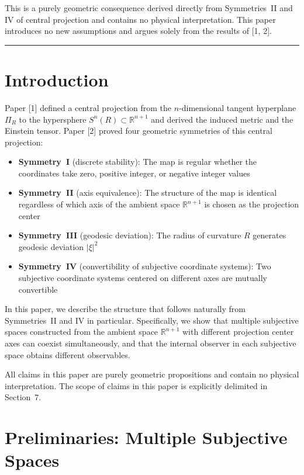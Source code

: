 \documentclass[a4paper,11pt]{article}
\theoremstyle{definition}
\begin{document}
This is a purely geometric consequence derived directly from Symmetries~II and IV of central projection and contains no physical interpretation. This paper introduces no new assumptions and argues solely from the results of {[1, 2]}.

\bigskip\hrule\bigskip

\section{Introduction}

Paper {[1]} defined a central projection from the \(n\)-dimensional tangent hyperplane \(\Pi_R\) to the hypersphere \(S^n(R) \subset \mathbb{R}^{n+1}\) and derived the induced metric and the Einstein tensor. Paper {[2]} proved four geometric symmetries of this central projection:

\begin{itemize}
\item \textbf{Symmetry~I} (discrete stability): The map is regular whether the coordinates take zero, positive integer, or negative integer values
\item \textbf{Symmetry~II} (axis equivalence): The structure of the map is identical regardless of which axis of the ambient space \(\mathbb{R}^{n+1}\) is chosen as the projection center
\item \textbf{Symmetry~III} (geodesic deviation): The radius of curvature \(R\) generates geodesic deviation \(|\xi|^2\)
\item \textbf{Symmetry~IV} (convertibility of subjective coordinate systems): Two subjective coordinate systems centered on different axes are mutually convertible
\end{itemize}

In this paper, we describe the structure that follows naturally from Symmetries~II and IV in particular. Specifically, we show that multiple subjective spaces constructed from the ambient space \(\mathbb{R}^{n+1}\) with different projection center axes can coexist simultaneously, and that the internal observer in each subjective space obtains different observables.

All claims in this paper are purely geometric propositions and contain no physical interpretation. The scope of claims in this paper is explicitly delimited in Section~7.

\section{Preliminaries: Multiple Subjective Spaces}
\end{document}
